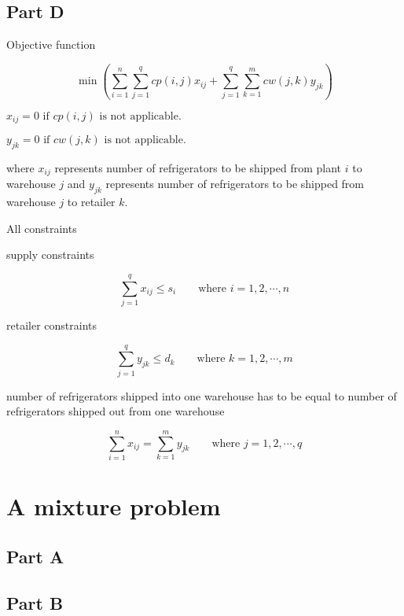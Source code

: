 \documentclass[11pt]{scrreprt}
\begin{document}
\section{Part D}

Objective function

\begin{displaymath}
\min \left(\sum_{i=1}^{n} \sum_{j=1}^{q} cp(i,j)x_{ij} + \sum_{j=1}^{q} \sum_{k=1}^{m} cw(j,k)y_{jk}\right)
\end{displaymath}

$x_{ij}=0 \textrm{ if } cp(i,j) \textrm{ is not applicable. } $

$y_{jk}=0 \textrm{ if } cw(j,k) \textrm{ is not applicable.} $

where $x_{ij}$ represents number of refrigerators to be shipped from plant $i$ to warehouse $j$ and $y_{jk}$ represents number of refrigerators to be shipped  from warehouse $j$ to retailer $k$.

All constraints

supply constraints

\begin{displaymath}
\sum_{j=1}^{q} x_{ij} \leq s_i \qquad\textrm{where } i=1,2,\cdots,n
\end{displaymath}

retailer constraints

\begin{displaymath}
\sum_{j=1}^{q} y_{jk} \leq d_k \qquad\textrm{where } k=1,2,\cdots,m
\end{displaymath}

number of refrigerators shipped into one warehouse has to be equal to number of refrigerators shipped out from one warehouse

\begin{displaymath}
\sum_{i=1}^{n} x_{ij} = \sum_{k=1}^{m} y_{jk} \qquad\textrm{where } j=1,2,\cdots,q
\end{displaymath}

\chapter{A mixture problem}

\section{Part A}


\section{Part B}
\end{document}
